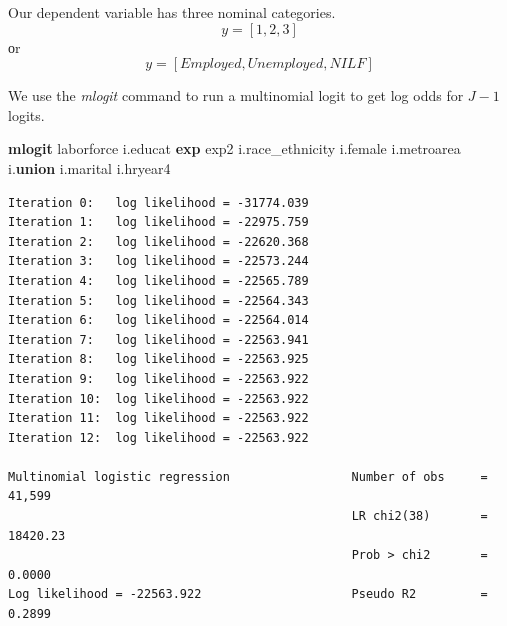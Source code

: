 \documentclass[
]{book}
\newenvironment{Shaded}{\begin{snugshade}}{\end{snugshade}}
\newcommand{\FunctionTok}[1]{\textcolor[rgb]{0.13,0.29,0.53}{\textbf{#1}}}
\newcommand{\KeywordTok}[1]{\textcolor[rgb]{0.13,0.29,0.53}{\textbf{#1}}}
\newcommand{\NormalTok}[1]{#1}
\begin{document}
Our dependent variable has three nominal categories.
\[ y=[1,2,3] \]
оr
\[ y=[Employed, Unemployed, NILF] \]

We use the \emph{mlogit} command to run a multinomial logit to get log odds for \(J-1\) logits.

\begin{Shaded}
\begin{Highlighting}[]
\KeywordTok{mlogit}\NormalTok{ laborforce i.educat }\FunctionTok{exp}\NormalTok{ exp2 i.race\_ethnicity i.female i.metroarea i.}\KeywordTok{union}\NormalTok{ i.marital i.hryear4}
\end{Highlighting}
\end{Shaded}

\begin{verbatim}
Iteration 0:   log likelihood = -31774.039  
Iteration 1:   log likelihood = -22975.759  
Iteration 2:   log likelihood = -22620.368  
Iteration 3:   log likelihood = -22573.244  
Iteration 4:   log likelihood = -22565.789  
Iteration 5:   log likelihood = -22564.343  
Iteration 6:   log likelihood = -22564.014  
Iteration 7:   log likelihood = -22563.941  
Iteration 8:   log likelihood = -22563.925  
Iteration 9:   log likelihood = -22563.922  
Iteration 10:  log likelihood = -22563.922  
Iteration 11:  log likelihood = -22563.922  
Iteration 12:  log likelihood = -22563.922  

Multinomial logistic regression                 Number of obs     =     41,599
                                                LR chi2(38)       =   18420.23
                                                Prob > chi2       =     0.0000
Log likelihood = -22563.922                     Pseudo R2         =     0.2899


\end{verbatim}
\end{document}
